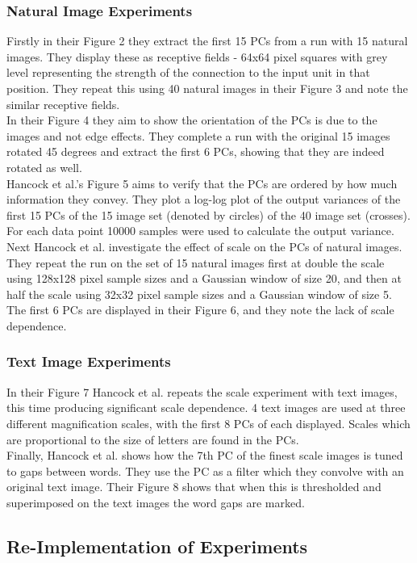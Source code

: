 \subsubsection{Natural Image Experiments}
Firstly in their Figure 2 they extract the first 15 PCs from a run with 15 natural images. They display these as receptive fields - 64x64 pixel squares with grey level representing the strength of the connection to the input unit in that position. They repeat this using 40 natural images in their Figure 3 and note the similar receptive fields.\\
In their Figure 4 they aim to show the orientation of the PCs is due to the images and not edge effects. They complete a run with the original 15 images rotated 45 degrees and extract the first 6 PCs, showing that they are indeed rotated as well.\\
Hancock et al.'s Figure 5 aims to verify that the PCs are ordered by how much information they convey. They plot a log-log plot of the output variances of the first 15 PCs of the 15 image set (denoted by circles) of the 40 image set (crosses). For each data point 10000 samples were used to calculate the output variance.\\
Next Hancock et al. investigate the effect of scale on the PCs of natural images. They repeat the run on the set of 15 natural images first at double the scale using 128x128 pixel sample sizes and a Gaussian window of size 20, and then at half the scale using 32x32 pixel sample sizes and a Gaussian window of size 5. The first 6 PCs are displayed in their Figure 6, and they note the lack of scale dependence.
\subsubsection{Text Image Experiments}
In their Figure 7 Hancock et al. repeats the scale experiment with text images, this time producing significant scale dependence. 4 text images are used at three different magnification scales, with the first 8 PCs of each displayed. Scales which are proportional to the size of letters are found in the PCs.\\
Finally, Hancock et al. shows how the 7th PC of the finest scale images is tuned to gaps between words. They use the PC as a filter which they convolve with an original text image. Their Figure 8 shows that when this is thresholded and superimposed on the text images the word gaps are marked.

\subsection{Re-Implementation of Experiments}

